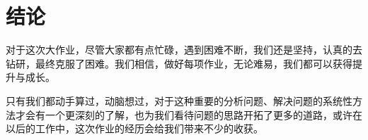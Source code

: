 \clearpage
\section{结论}

对于这次大作业，尽管大家都有点忙碌，遇到困难不断，我们还是坚持，认真的去钻研，最终克服了困难。我们相信，做好每项作业，无论难易，我们都可以获得提升与成长。
 
只有我们都动手算过，动脑想过，对于这种重要的分析问题、解决问题的系统性方法才会有一个更深刻的了解，也为我们看待问题的思路开拓了更多的道路，或许在以后的工作中，这次作业的经历会给我们带来不少的收获。 